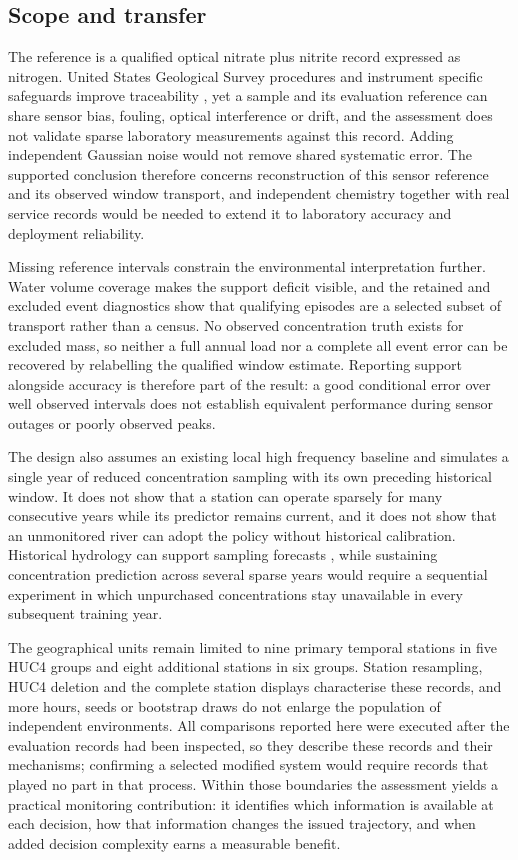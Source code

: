 \documentclass[pdflatex,sn-mathphys-num]{sn-jnl}%
\theoremstyle{thmstyleone}%
\theoremstyle{thmstyletwo}%
\theoremstyle{thmstylethree}%
\begin{document}
\subsection{Scope and transfer}

The reference is a qualified optical nitrate plus nitrite record expressed as nitrogen. United States Geological Survey procedures and instrument specific safeguards improve traceability \citep{wagner2006,pellerin2013}, yet a sample and its evaluation reference can share sensor bias, fouling, optical interference or drift, and the assessment does not validate sparse laboratory measurements against this record. Adding independent Gaussian noise would not remove shared systematic error. The supported conclusion therefore concerns reconstruction of this sensor reference and its observed window transport, and independent chemistry together with real service records would be needed to extend it to laboratory accuracy and deployment reliability.

Missing reference intervals constrain the environmental interpretation further. Water volume coverage makes the support deficit visible, and the retained and excluded event diagnostics show that qualifying episodes are a selected subset of transport rather than a census. No observed concentration truth exists for excluded mass, so neither a full annual load nor a complete all event error can be recovered by relabelling the qualified window estimate. Reporting support alongside accuracy is therefore part of the result: a good conditional error over well observed intervals does not establish equivalent performance during sensor outages or poorly observed peaks.

The design also assumes an existing local high frequency baseline and simulates a single year of reduced concentration sampling with its own preceding historical window. It does not show that a station can operate sparsely for many consecutive years while its predictor remains current, and it does not show that an unmonitored river can adopt the policy without historical calibration. Historical hydrology can support sampling forecasts \citep{wilson2026}, while sustaining concentration prediction across several sparse years would require a sequential experiment in which unpurchased concentrations stay unavailable in every subsequent training year.

The geographical units remain limited to nine primary temporal stations in five HUC4 groups and eight additional stations in six groups. Station resampling, HUC4 deletion and the complete station displays characterise these records, and more hours, seeds or bootstrap draws do not enlarge the population of independent environments. All comparisons reported here were executed after the evaluation records had been inspected, so they describe these records and their mechanisms; confirming a selected modified system would require records that played no part in that process. Within those boundaries the assessment yields a practical monitoring contribution: it identifies which information is available at each decision, how that information changes the issued trajectory, and when added decision complexity earns a measurable benefit.
\end{document}
